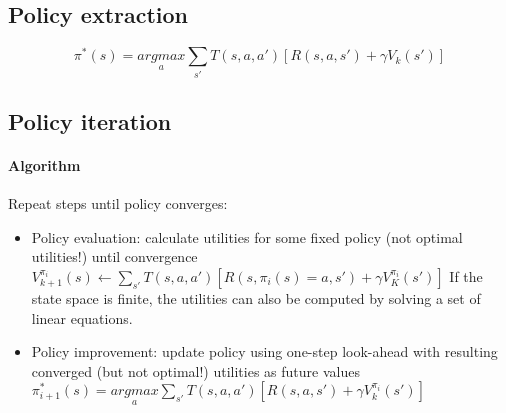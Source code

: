 \subsection{Policy extraction}

\begin{equation}
    \pi^*(s) = \underset{a}{arg max}\sum_{s'}{T(s,a,a')[R(s,a, s') + \gamma V_k(s')]}
\end{equation}

\subsection{Policy iteration}

\paragraph{Algorithm} Repeat steps until policy converges:
\begin{itemize}
    \item Policy evaluation: calculate utilities for some fixed policy (not optimal utilities!) until convergence
    \begin{math}
    V^{\pi_i}_{k+1}(s) \leftarrow \sum_{s'}{T(s,a,a')[R(s,\pi_i(s)=a, s') + \gamma V^{\pi_i}_K(s')]}
    \end{math}
    If the state space is finite, the utilities can also be computed by solving a set of linear equations.
    \item Policy improvement: update policy using one-step look-ahead with resulting converged (but not optimal!) utilities as future values
    \begin{math}
    \pi^*_{i+1}(s) = \underset{a}{argmax}\sum_{s'}{T(s,a,a')[R(s,a, s') + \gamma V_k^{\pi_i}(s')]}
    \end{math}
\end{itemize}